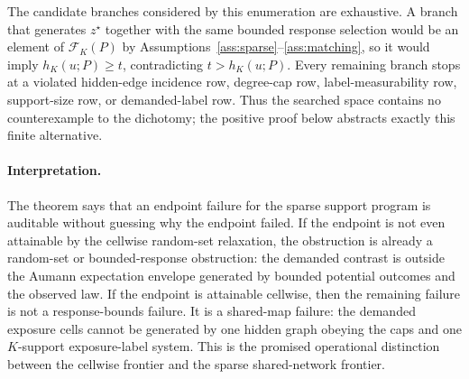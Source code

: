 The candidate branches considered by this enumeration are exhaustive.  A branch that generates \(z^\star\) together with the same bounded response selection would be an element of \(\mathcal F_K(P)\) by Assumptions~\ref{ass:sparse}--\ref{ass:matching}, so it would imply \(h_K(u;P)\ge t\), contradicting \(t>h_K(u;P)\).  Every remaining branch stops at a violated hidden-edge incidence row, degree-cap row, label-measurability row, support-size row, or demanded-label row.  Thus the searched space contains no counterexample to the dichotomy; the positive proof below abstracts exactly this finite alternative.

\paragraph{Interpretation.}
The theorem says that an endpoint failure for the sparse support program is auditable without guessing why the endpoint failed.  If the endpoint is not even attainable by the cellwise random-set relaxation, the obstruction is already a random-set or bounded-response obstruction: the demanded contrast is outside the Aumann expectation envelope generated by bounded potential outcomes and the observed law.  If the endpoint is attainable cellwise, then the remaining failure is not a response-bounds failure.  It is a shared-map failure: the demanded exposure cells cannot be generated by one hidden graph obeying the caps and one \(K\)-support exposure-label system.  This is the promised operational distinction between the cellwise frontier and the sparse shared-network frontier.

